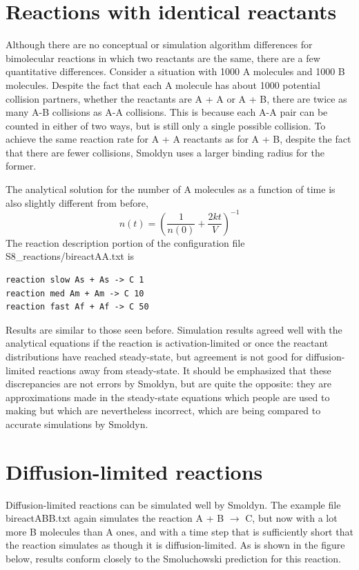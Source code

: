 \documentclass {book}
\begin{document}
\section{Reactions with identical reactants}

Although there are no conceptual or simulation algorithm differences for bimolecular reactions in which two reactants are the same, there are a few quantitative differences. Consider a situation with 1000 A molecules and 1000 B molecules. Despite the fact that each A molecule has about 1000 potential collision partners, whether the reactants are A + A or A + B, there are twice as many A-B collisions as A-A collisions. This is because each A-A pair can be counted in either of two ways, but is still only a single possible collision. To achieve the same reaction rate for A + A reactants as for A + B, despite the fact that there are fewer collisions, Smoldyn uses a larger binding radius for the former.

The analytical solution for the number of A molecules as a function of time is also slightly different from before,
$$n(t) = \left(\frac{1}{n(0)} + \frac{2kt}{V} \right)^{-1}$$
The reaction description portion of the configuration file S8\_reactions/bireactAA.txt is

\begin{lstlisting}[style=SSAC]
reaction slow As + As -> C 1
reaction med Am + Am -> C 10
reaction fast Af + Af -> C 50
\end{lstlisting}
Results are similar to those seen before. Simulation results agreed well with the analytical equations if the reaction is activation-limited or once the reactant distributions have reached steady-state, but agreement is not good for diffusion-limited reactions away from steady-state. It should be emphasized that these discrepancies are not errors by Smoldyn, but are quite the opposite: they are approximations made in the steady-state equations which people are used to making but which are nevertheless incorrect, which are being compared to accurate simulations by Smoldyn.

\section{Diffusion-limited reactions}

Diffusion-limited reactions can be simulated well by Smoldyn. The example file bireactABB.txt again simulates the reaction A + B $\rightarrow$ C, but now with a lot more B molecules than A ones, and with a time step that is sufficiently short that the reaction simulates as though it is diffusion-limited. As is shown in the figure below, results conform closely to the Smoluchowski prediction for this reaction.
\end{document}
